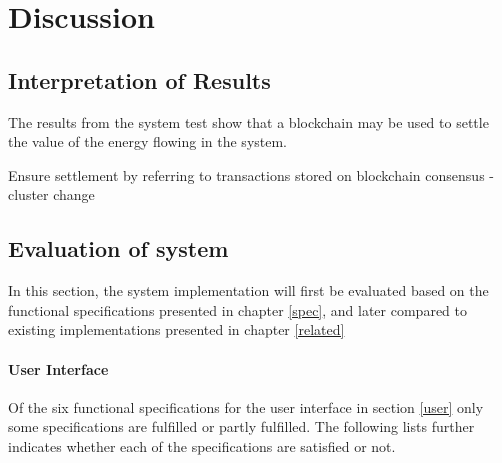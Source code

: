 \chapter{Discussion} \label{discussion}
\section{Interpretation of Results}
The results from the system test show that a blockchain may be used to settle the value of the energy flowing in the system. 

Ensure settlement by referring to transactions stored on blockchain
consensus - cluster change

\section{Evaluation of system}
In this section, the system implementation will first be evaluated based on the functional specifications presented in chapter \ref{spec}, and later compared to existing implementations presented in chapter \ref{related}

\subsubsection*{User Interface}
Of the six functional specifications for the user interface in section \ref{user} only some specifications are fulfilled or partly fulfilled. The following lists further indicates whether each of the specifications are satisfied or not.

